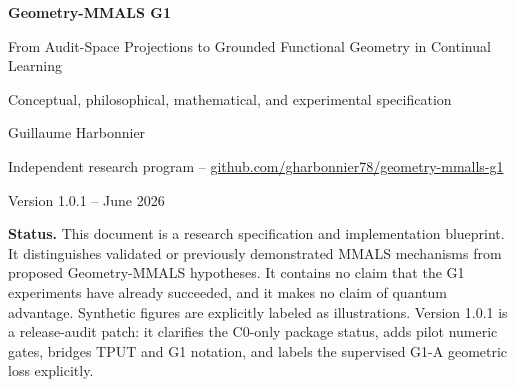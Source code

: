 \documentclass[11pt,a4paper]{article}
\begin{document}
\begin{titlepage}
\centering
\vspace*{1.2cm}
{\Huge\bfseries\color{deepblue} Geometry-MMALS G1\par}
\vspace{0.3cm}
{\LARGE From Audit-Space Projections to Grounded Functional Geometry in Continual Learning\par}
\vspace{0.6cm}
{\large Conceptual, philosophical, mathematical, and experimental specification\par}
\vspace{1.2cm}
{\Large Guillaume Harbonnier\par}
\vspace{0.2cm}
{\normalsize Independent research program -- \href{https://github.com/gharbonnier78/geometry-mmalls-g1}{github.com/gharbonnier78/geometry-mmalls-g1}\par}
\vspace{0.8cm}
{\normalsize Version 1.0.1 -- June 2026\par}
\vfill
\begin{minipage}{0.88\textwidth}
\small
\textbf{Status.} This document is a research specification and implementation blueprint. It distinguishes validated or previously demonstrated MMALS mechanisms from proposed Geometry-MMALS hypotheses. It contains no claim that the G1 experiments have already succeeded, and it makes no claim of quantum advantage. Synthetic figures are explicitly labeled as illustrations. Version 1.0.1 is a release-audit patch: it clarifies the C0-only package status, adds pilot numeric gates, bridges TPUT and G1 notation, and labels the supervised G1-A geometric loss explicitly.
\end{minipage}
\vfill
\end{titlepage}
\end{document}
